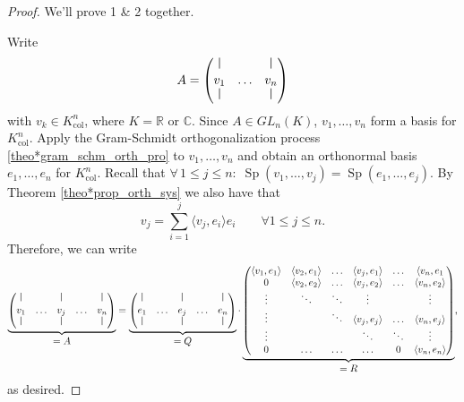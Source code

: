 \begin{proof}
	We'll prove 1 \& 2 together. 
	
	Write
	\[
		A = \begin{pmatrix}
			\rule{0.5pt}{2ex} & & \rule{0.5pt}{2ex}\\
			v_1 & \hdots & v_n\\
			\rule{0.5pt}{2ex} & & \rule{0.5pt}{2ex}\\
		\end{pmatrix}
	\]
	with $v_k \in K^n_{\text{col}}$, where $K = \mathbb{R}$ or $\mathbb{C}$. Since $A \in GL_n(K)$, $v_1, \hdots , v_n$ form a basis for $K^n_{\text{col}}$. Apply the Gram-Schmidt orthogonalization process \ref{theo*gram_schm_orth_pro} to $v_1, \hdots , v_n$ and obtain an orthonormal basis $e_1, \hdots , e_n$ for $K^n_{\text{col}}$. Recall that $\forall \, 1 \leq j \leq n : \; \operatorname{Sp}(v_1, \hdots , v_j) = \operatorname{Sp}(e_1, \hdots , e_j)$. By Theorem \ref{theo*prop_orth_sys} we also have that
	\[
		v_j = \sum_{i=1}^{j} \langle v_j, e_i\rangle e_i \qquad \forall 1 \leq j \leq n.
	\]
	Therefore, we can write
	\begin{equation*}
		\underbrace{\begin{pmatrix}
			\rule{0.5pt}{2ex} & & \rule{0.5pt}{2ex} & & \rule{0.5pt}{2ex}\\
			v_1 & \hdots & v_j & \hdots & v_n\\
			\rule{0.5pt}{2ex} & & \rule{0.5pt}{2ex} & & \rule{0.5pt}{2ex}\\	
		\end{pmatrix}}_{\displaystyle = A}
		=
		\underbrace{\begin{pmatrix}
			\rule{0.5pt}{2ex} & & \rule{0.5pt}{2ex} & & \rule{0.5pt}{2ex}\\
			e_1 & \hdots & e_j & \hdots & e_n\\
			\rule{0.5pt}{2ex} & & \rule{0.5pt}{2ex} & & \rule{0.5pt}{2ex}\\			
		\end{pmatrix}}_{\displaystyle = Q}
		\cdot
		\underbrace{\begin{pmatrix}
			\langle v_1, e_1 \rangle & \langle v_2, e_1 \rangle & \hdots & \langle v_j, e_1 \rangle & \hdots & \langle v_n, e_1\\
			0 & \langle v_2, e_2 \rangle & \hdots & \langle v_j, e_2 \rangle & \hdots & \langle v_n, e_2\rangle\\
			\vdots & \ddots & \ddots & \vdots &  & \vdots \\
			\vdots & & \ddots & \langle v_j, e_j \rangle & \hdots & \langle v_n, e_j \rangle\\
			\vdots & & & \ddots & \ddots & \vdots \\
			0 & \hdots & \hdots & \hdots & 0 & \langle v_n, e_n \rangle
		\end{pmatrix}}_{\displaystyle = R},
	\end{equation*}
	as desired. \qedhere
	
\end{proof}

